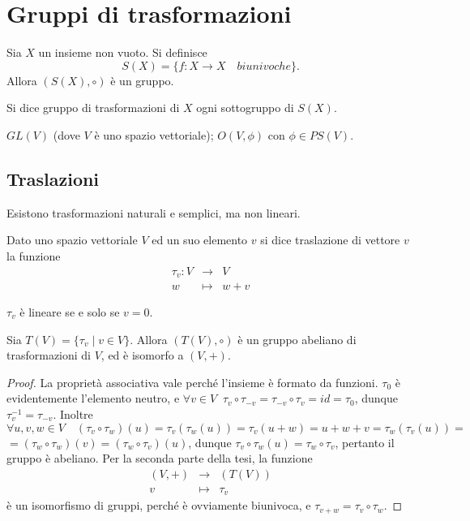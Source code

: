  
 \section{Gruppi di trasformazioni}
 
 Sia $ X $ un  insieme non vuoto. Si definisce $$S(X)=\{f:X\to X\quad biunivoche\}.$$ 
 Allora $(S(X),\circ)$ è un gruppo.
 
 \begin{definition}
 Si dice gruppo di trasformazioni di $X$ ogni sottogruppo di $S(X).$
 \end{definition}
 
 \begin{example}
 $GL(V)$ (dove $V$ è uno spazio vettoriale); $O(V,\phi)$ con $\phi\in PS(V).$
 \end{example}
 
 \subsection{Traslazioni}
 
 Esistono trasformazioni naturali e semplici, ma non lineari.
 
 \begin{definition}
  Dato uno spazio vettoriale $V$ ed un suo elemento $v$ si dice traslazione di vettore $v$ la funzione
 \begin{eqnarray*}
	\tau_v:V & \to & V \\
	w & \mapsto & w+v
 \end{eqnarray*}
 \end{definition}
 
 \begin{remark}
  $\tau_v$ è lineare se e solo se $v=0$.
 \end{remark}
 
 \begin{proposition}
 Sia $T(V)=\{\tau_v\;|\;v\in V\}$. Allora $(T(V),\circ)$
 è un gruppo abeliano di trasformazioni di $V$, ed è isomorfo a $(V,+)$.
 \end{proposition}
 
 \begin{proof}
La proprietà associativa vale perché l'insieme è formato da funzioni.
 $\tau_0$ è evidentemente l'elemento neutro, e $\forall v\in V\;\; \tau_v\circ\tau_{-v}=\tau_{-v}\circ\tau_v=id=\tau_0$, 
 dunque $\tau_v^{-1}=\tau_{-v}$.
 Inoltre $\forall u,v,w\in V\quad (\tau_v\circ\tau_w)(u)=\tau_v(\tau_w(u))=\tau_v(u+w)=u+w+v=\tau_w(\tau_v(u))=$
 $=(\tau_w\circ\tau_w)(v)=(\tau_w\circ\tau_v)(u)$, dunque  $\tau_v\circ\tau_w(u)=\tau_w\circ\tau_v$,
  pertanto il gruppo è abeliano.
 Per la seconda parte della tesi, la funzione
 \begin{eqnarray*}
	(V,+) & \to & (T(V)) \\
	v & \mapsto & \tau_v
 \end{eqnarray*}
 è un isomorfismo di gruppi, perché è ovviamente biunivoca, e  $\tau_{v+w}=\tau_v\circ\tau_w$.
  \end{proof}
  
